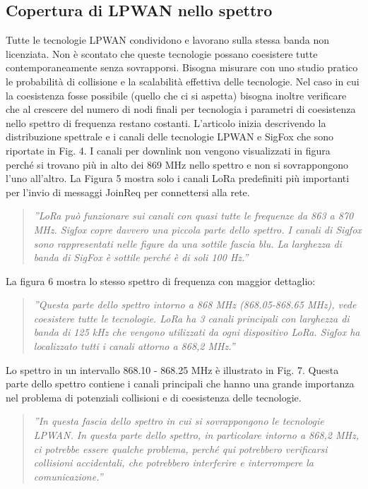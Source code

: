 \documentclass[a4paper]{report} %
\begin{document}
\subsection{Copertura di LPWAN nello spettro}
Tutte le tecnologie LPWAN condividono e lavorano sulla stessa banda non licenziata. Non è scontato che queste tecnologie possano coesistere tutte contemporaneamente senza sovrapporsi. Bisogna misurare con uno studio pratico le probabilità di collisione e la scalabilità effettiva delle tecnologie. Nel caso in cui la coesistenza fosse possibile (quello che ci si aspetta) bisogna inoltre verificare che al crescere del numero di nodi finali per tecnologia i parametri di coesistenza nello spettro di frequenza restano costanti.
L'articolo \cite{art:rif.46} inizia descrivendo la distribuzione spettrale e i canali delle tecnologie LPWAN e SigFox che sono riportate in Fig. 4. I canali per downlink non vengono visualizzati in figura perché si trovano più in alto dei 869 MHz nello spettro e non si sovrappongono l'uno all'altro. La Figura 5 mostra solo i canali LoRa predefiniti più importanti per l'invio di messaggi JoinReq per connettersi alla rete.  
\begin{quote}
	\textit{''LoRa può funzionare sui canali con quasi tutte le frequenze da 863 a 870 MHz. Sigfox copre davvero una piccola parte dello spettro. I canali di Sigfox sono rappresentati nelle figure da una sottile fascia blu. La larghezza di banda di SigFox è sottile perché è di soli 100 Hz.''}
\end{quote}
La figura 6 mostra lo stesso spettro di frequenza con maggior dettaglio:
\begin{quote}
	\textit{''Questa parte dello spettro intorno a 868 MHz (868.05-868.65 MHz), vede coesistere tutte le tecnologie. LoRa ha 3 canali principali con larghezza di banda di 125 kHz che vengono utilizzati da ogni dispositivo LoRa. Sigfox ha localizzato tutti i canali attorno a 868,2 MHz.''}
\end{quote}
Lo spettro in un intervallo 868.10 - 868.25 MHz è illustrato in Fig. 7. Questa parte dello spettro contiene i canali principali che hanno una grande importanza nel problema di potenziali collisioni e di coesistenza delle tecnologie. 
\begin{quote}
	\textit{''In questa fascia dello spettro in cui si sovrappongono le tecnologie LPWAN. In questa parte dello spettro, in particolare intorno a 868,2 MHz, ci potrebbe essere qualche problema, perché qui potrebbero verificarsi collisioni accidentali, che potrebbero interferire e interrompere la comunicazione.''}
\end{quote}
\end{document}
